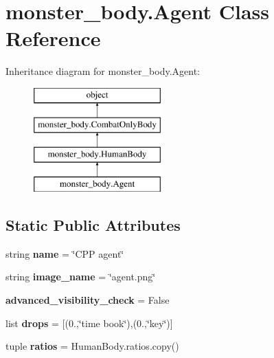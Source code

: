 \hypertarget{classmonster__body_1_1_agent}{}\section{monster\+\_\+body.\+Agent Class Reference}
\label{classmonster__body_1_1_agent}
Inheritance diagram for monster\+\_\+body.\+Agent\+:\begin{figure}[H]
\begin{center}
\leavevmode
\includegraphics[height=4.000000cm]{classmonster__body_1_1_agent}
\end{center}
\end{figure}
\subsection*{Static Public Attributes}
\begin{DoxyCompactItemize}
\item 
\hypertarget{classmonster__body_1_1_agent_a96bea34550cd2be622465b946e6d1342}{}string {\bfseries name} = \char`\"{}C\+P\+P agent\char`\"{}\label{classmonster__body_1_1_agent_a96bea34550cd2be622465b946e6d1342}

\item 
\hypertarget{classmonster__body_1_1_agent_abaaab42538036eb4ab4e516ad285c645}{}string {\bfseries image\+\_\+name} = \char`\"{}agent.\+png\char`\"{}\label{classmonster__body_1_1_agent_abaaab42538036eb4ab4e516ad285c645}

\item 
\hypertarget{classmonster__body_1_1_agent_af5c535fd71cd6c4832d17140cf45e97b}{}{\bfseries advanced\+\_\+visibility\+\_\+check} = False\label{classmonster__body_1_1_agent_af5c535fd71cd6c4832d17140cf45e97b}

\item 
\hypertarget{classmonster__body_1_1_agent_a82dc8f2915a652753c64d7cb123e09c6}{}list {\bfseries drops} = \mbox{[}(0.,\char`\"{}time book\char`\"{}),(0.,\char`\"{}key\char`\"{})\mbox{]}\label{classmonster__body_1_1_agent_a82dc8f2915a652753c64d7cb123e09c6}

\item 
\hypertarget{classmonster__body_1_1_agent_a5c49dca0874f6b5581d448f80f33deee}{}tuple {\bfseries ratios} = Human\+Body.\+ratios.\+copy()\label{classmonster__body_1_1_agent_a5c49dca0874f6b5581d448f80f33deee}

\end{DoxyCompactItemize}

